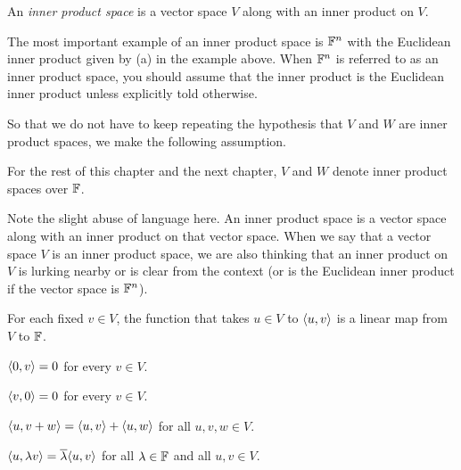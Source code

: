 \begin{definition}\label{ax:6.4}
An \emph{inner product space} is a vector space $V$ along with an inner product
on $V$.
\end{definition}

The most important example of an inner product space is $\mathbb{F}^n$ with the
Euclidean inner product given by (a) in the example above. When $\mathbb{F}^n$ is
referred to as an inner product space, you should assume that the inner product
is the Euclidean inner product unless explicitly told otherwise.

So that we do not have to keep repeating the hypothesis that $V$ and $W$ are
inner product spaces, we make the following assumption.

\begin{notation}[$V$, $W$]\label{ax:6.5}
For the rest of this chapter and the next chapter, $V$ and $W$ denote inner
product spaces over $\mathbb{F}$.
\end{notation}

Note the slight abuse of language here. An inner product space is a vector
space along with an inner product on that vector space. When we say that a
vector space $V$ is an inner product space, we are also thinking that an inner
product on $V$ is lurking nearby or is clear from the context (or is the
Euclidean inner product if the vector space is $\mathbb{F}^n$).

\begin{result}\label{ax:6.6}\leavevmode
\begin{parts}
\item For each fixed $v\in V$, the function that takes $u\in V$ to $\langle u, v \rangle$
  is a linear map from $V$ to $\mathbb{F}$.
\item $\langle 0, v \rangle=0$ for every $v\in V$.
\item $\langle v, 0 \rangle=0$ for every $v\in V$.
\item $\langle u, v+w \rangle=\langle u, v \rangle+\langle u, w \rangle$ for all $u,v,w\in V$.
\item $\langle u, \lambda v \rangle=\overline{\lambda}\langle u, v \rangle$ for all $\lambda\in\mathbb{F}$
  and all $u,v\in V$.
\end{parts}
\end{result}

